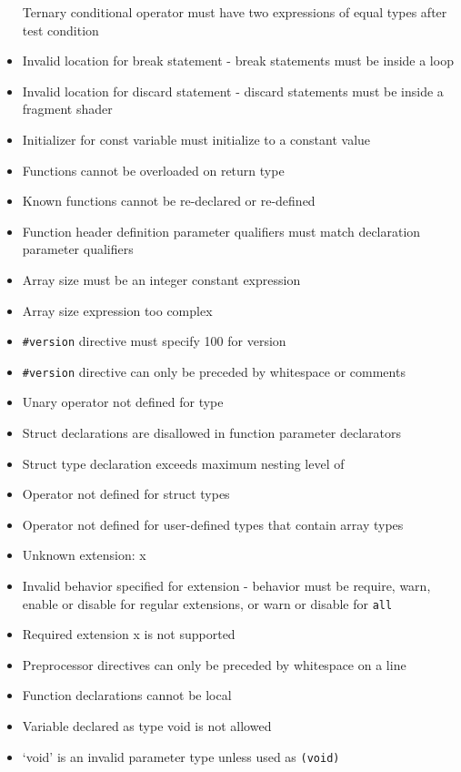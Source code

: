 \documentclass[]{article}
\begin{document}
\begin{itemize}
  Ternary conditional operator must have two expressions of equal types
  after test condition
\item
  Invalid location for break statement - break statements must be inside
  a loop
\item
  Invalid location for discard statement - discard statements must be
  inside a fragment shader
\item
  Initializer for const variable must initialize to a constant value
\item
  Functions cannot be overloaded on return type
\item
  Known functions cannot be re-declared or re-defined
\item
  Function header definition parameter qualifiers must match declaration
  parameter qualifiers
\item
  Array size must be an integer constant expression
\item
  Array size expression too complex
\item
  \texttt{\#version} directive must specify 100 for version
\item
  \texttt{\#version} directive can only be preceded by whitespace or
  comments
\item
  Unary operator not defined for type
\item
  Struct declarations are disallowed in function parameter declarators
\item
  Struct type declaration exceeds maximum nesting level of
\item
  Operator not defined for struct types
\item
  Operator not defined for user-defined types that contain array types
\item
  Unknown extension: x
\item
  Invalid behavior specified for extension - behavior must be require,
  warn, enable or disable for regular extensions, or warn or disable for
  \texttt{all}
\item
  Required extension x is not supported
\item
  Preprocessor directives can only be preceded by whitespace on a line
\item
  Function declarations cannot be local
\item
  Variable declared as type void is not allowed
\item
  `void' is an invalid parameter type unless used as \texttt{(void)}
\end{itemize}
\end{document}
